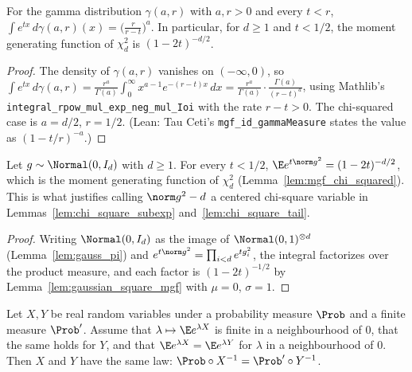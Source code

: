 \begin{lemma}
\label{lem:mgf_chi_squared}
\leanok
{}
For the gamma distribution $\gamma(a,r)$ with $a, r > 0$ and every $t < r$,
$\int e^{tx}\,d\gamma(a,r)(x) = \big(\frac{r}{r-t}\big)^a$. In particular, for $d \ge 1$ and
$t < 1/2$, the moment generating function of $\chi^2_d$ is $(1-2t)^{-d/2}$.
\end{lemma}

\begin{proof}
\leanok
The density of $\gamma(a,r)$ vanishes on $(-\infty,0)$, so
$\int e^{tx}\,d\gamma(a,r) = \frac{r^a}{\Gamma(a)}\int_0^\infty x^{a-1}e^{-(r-t)x}\,dx
= \frac{r^a}{\Gamma(a)}\cdot\frac{\Gamma(a)}{(r-t)^a}$, using Mathlib's
\texttt{integral\_rpow\_mul\_exp\_neg\_mul\_Ioi} with the rate $r - t > 0$. The chi-squared case is
$a = d/2$, $r = 1/2$. (Lean: Tau Ceti's \texttt{mgf\_id\_gammaMeasure} states the value as
$(1 - t/r)^{-a}$.)
\end{proof}

\begin{lemma}\label{lem:norm_sq_chi_squared}
\leanok
{}
Let $g \sim \Normal(0,I_d)$ with $d \ge 1$. For every $t < 1/2$,
$\E e^{t\norm g^2} = (1-2t)^{-d/2}$, which is the moment generating function of $\chi^2_d$
(Lemma~\ref{lem:mgf_chi_squared}). This is what justifies calling $\norm g^2 - d$ a centered
chi-square variable in Lemmas~\ref{lem:chi_square_subexp} and~\ref{lem:chi_square_tail}.
\end{lemma}

\begin{proof}
\leanok
Writing $\Normal(0,I_d)$ as the image of $\Normal(0,1)^{\otimes d}$
(Lemma~\ref{lem:gauss_pi}) and $e^{t\norm g^2} = \prod_{i<d} e^{tg_i^2}$, the integral factorizes
over the product measure, and each factor is $(1-2t)^{-1/2}$ by
Lemma~\ref{lem:gaussian_square_mgf} with $\mu = 0$, $\sigma = 1$.
\end{proof}

\begin{theorem}\label{thm:ext_of_mgf}
\leanok
Let $X, Y$ be real random variables under a probability measure $\Prob$ and a finite measure
$\Prob'$. Assume that $\lambda \mapsto \E e^{\lambda X}$ is finite in a neighbourhood of $0$, that
the same holds for $Y$, and that $\E e^{\lambda X} = \E e^{\lambda Y}$ for $\lambda$ in a
neighbourhood of $0$. Then $X$ and $Y$ have the same law: $\Prob\circ X^{-1} = \Prob'\circ Y^{-1}$.
\end{theorem}

